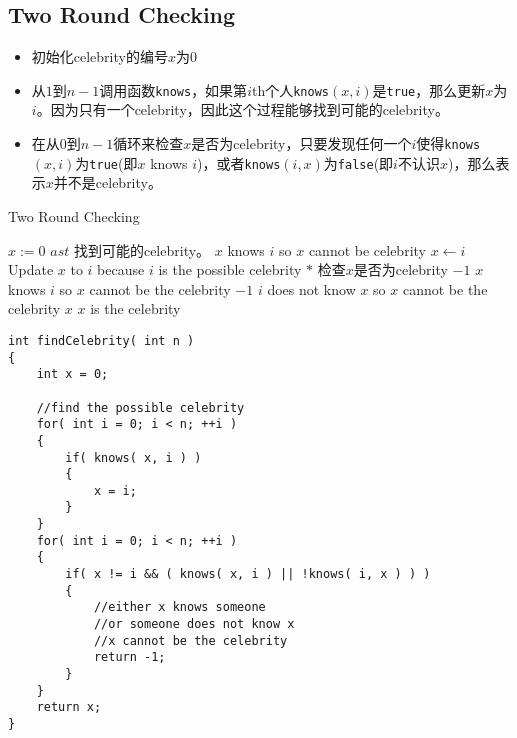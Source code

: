 \subsection{Two Round Checking}
\begin{itemize}
\item 初始化celebrity的编号$x$为0
\item 从$1$到$n-1$调用函数\texttt{knows}，如果第$i$th个人\texttt{knows}$(x,i)$是\texttt{true}，那么更新$x$为$i$。因为只有一个celebrity，因此这个过程能够找到可能的celebrity。
\item 在从$0$到$n-1$循环来检查$x$是否为celebrity，只要发现任何一个$i$使得\texttt{knows}$(x,i)$为\texttt{true}(即$x$ knows $i$)，或者\texttt{knows}$(i,x)$为\texttt{false}(即$i$不认识$x$)，那么表示$x$并不是celebrity。
\end{itemize}
\setcounter{algorithm}{0}
\begin{algorithm}[H]
\caption{Two Round Checking}
\begin{algorithmic}[1]
\State $x:=0$
\State $ast$ 找到可能的celebrity。
 \Comment $x$ knows $i$ so $x$ cannot be celebrity
\State $x\gets i$ \Comment Update $x$ to $i$ because $i$ is the possible celebrity
\EndIf
\EndFor
\State $\ast$ 检查$x$是否为celebrity
\State \Return $-1$ \Comment $x$ knows $i$ so $x$ cannot be the celebrity
\EndIf
{}
\State \Return $-1$ \Comment $i$ does not know $x$ so $x$ cannot be the celebrity
\EndIf
\EndIf
\EndFor
\State \Return $x$ \Comment $x$ is the celebrity
\EndProcedure
\end{algorithmic}
\end{algorithm}
\setcounter{lstlisting}{0}
\begin{lstlisting}[style=customc, caption={Two Round Checking}]
int findCelebrity( int n )
{
    int x = 0;

    //find the possible celebrity
    for( int i = 0; i < n; ++i )
    {
        if( knows( x, i ) )
        {
            x = i;
        }
    }
    for( int i = 0; i < n; ++i )
    {
        if( x != i && ( knows( x, i ) || !knows( i, x ) ) )
        {
            //either x knows someone
            //or someone does not know x
            //x cannot be the celebrity
            return -1;
        }
    }
    return x;
}
\end{lstlisting}